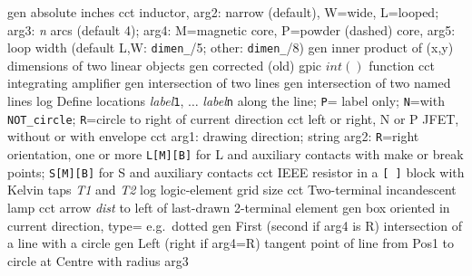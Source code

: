   {gen}
  {absolute inches}
  {cct}
  {inductor, arg2: narrow (default), W=wide, L=looped;
   arg3: {\sl n} arcs (default 4);
   arg4: M=magnetic core, P=powder (dashed) core,
   arg5: loop width (default L,W: {\tt dimen\_}/5; other: {\tt dimen\_}/8)
   }
  {gen}
  {inner product of (x,y) dimensions of two linear objects}
  {gen}
  {corrected (old) gpic $int()$ function}
  {cct}
  {integrating amplifier}
  {gen}
  {intersection of two lines}
  {gen}
  {intersection of two named lines}
  {log}
  {Define locations {\sl label}{\tt 1}, $\ldots$ {\sl label}{\tt n}
    along the line; {\tt P}= label only;
    {\tt N}=with {\tt NOT\_circle};
    {\tt R}=circle to right of current direction }
%
  {cct}
  {left or right, N or P JFET, without or with envelope
    }
  {cct}
  {arg1: drawing direction; string arg2: {\tt R}=right orientation,
   one or more {\tt L[M][B]} for L and auxiliary contacts with make or break
   points; {\tt S[M][B]} for S and auxiliary contacts
   }
%
  {cct}
  {IEEE resistor in a {\tt [ ]} block with Kelvin taps {\sl T1} and {\sl T2}
   }
%
  {log}
  {logic-element grid size}
  {cct}
  {Two-terminal incandescent lamp
   }
  {cct}
  {arrow {\sl dist} to left of last-drawn 2-terminal element
   }
  {gen}
  {box oriented in current direction, type= e.g.\ dotted}
  {gen}
  { First (second if arg4 is R) intersection of a line with a circle}
  {gen}
  { Left (right if arg4=R) tangent point of line
     from Pos1 to circle at Centre with radius arg3}
